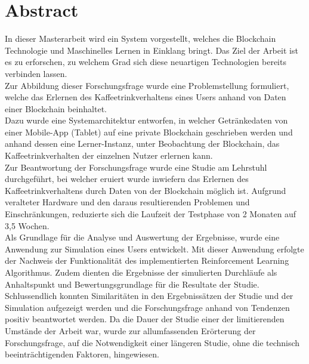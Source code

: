 \chapter{Abstract}
In dieser Masterarbeit wird ein System vorgestellt, welches die Blockchain Technologie und Maschinelles Lernen in Einklang bringt. Das Ziel der Arbeit ist es zu erforschen, zu welchem Grad sich diese neuartigen Technologien bereits verbinden lassen. \\
Zur Abbildung dieser Forschungsfrage wurde eine Problemstellung formuliert, welche das Erlernen des Kaffeetrinkverhaltens eines Users anhand von Daten einer Blockchain beinhaltet.\\
Dazu wurde eine Systemarchitektur entworfen, in welcher Getränkedaten von einer Mobile-App (Tablet) auf eine private Blockchain geschrieben werden und anhand dessen eine Lerner-Instanz, unter Beobachtung der Blockchain, das Kaffeetrinkverhalten der einzelnen Nutzer erlernen kann.\\
Zur Beantwortung der Forschungsfrage wurde eine Studie am Lehrstuhl durchgeführt, bei welcher eruiert wurde inwiefern das Erlernen des Kaffeetrinkverhaltens durch Daten von der Blockchain möglich ist. Aufgrund veralteter Hardware und den daraus resultierenden Problemen und Einschränkungen, reduzierte sich die Laufzeit der Testphase von 2 Monaten auf 3,5 Wochen.\\
Als Grundlage für die Analyse und Auswertung der Ergebnisse, wurde eine Anwendung zur Simulation eines Users entwickelt. Mit dieser Anwendung erfolgte der Nachweis der Funktionalität des implementierten Reinforcement Learning Algorithmus. Zudem dienten die Ergebnisse der simulierten Durchläufe als Anhaltspunkt und Bewertungsgrundlage für die Resultate der Studie. \\
Schlussendlich konnten Similaritäten in den Ergebnissätzen der Studie und der Simulation aufgezeigt werden und die Forschungsfrage anhand von Tendenzen positiv beantwortet werden.
Da die Dauer der Studie einer der limitierenden Umstände der Arbeit war, 
wurde zur all­um­fas­senden Erörterung der Forschungsfrage, auf die Notwendigkeit einer längeren Studie, ohne die technisch beeinträchtigenden Faktoren, hingewiesen.